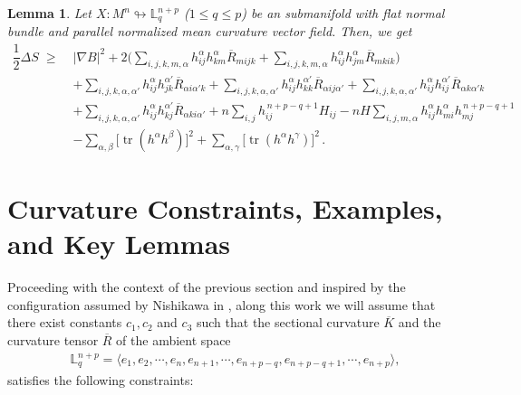 \documentclass[leqno,11pt]{amsart}
\theoremstyle{plain}
\newtheorem{lemma}[theorem]{\indent\sc Lemma}
\theoremstyle{definition}
\numberwithin{equation}{section}
\begin{document}
\begin{lemma}\label{simons desigualdade}
Let $X:M^{n}\looparrowright \mathbb{L}^{n+p}_{q}$ ($1\leq q\leq p$) be an submanifold with flat normal bundle and parallel normalized mean curvature vector field. Then, we get
\begin{equation}\label{simons_inequality}
\begin{aligned}
\dfrac{1}{2}\Delta S \; \geq \;& |\nabla B|^2
  + 2\Bigg(
      \sum_{i,j,k,m,\alpha} h_{ij}^{\alpha}h_{km}^{\alpha}\overline{R}_{mijk}
      + \sum_{i,j,k,m,\alpha} h_{ij}^{\alpha}h_{jm}^{\alpha}\overline{R}_{mkik}
    \Bigg) \\[6pt]
&+ \sum_{i,j,k,\alpha,\alpha'} h_{ij}^{\alpha}h_{jk}^{\alpha'}\overline{R}_{\alpha i \alpha' k}
  + \sum_{i,j,k,\alpha,\alpha'} h_{ij}^{\alpha}h_{kk}^{\alpha'}\overline{R}_{\alpha ij \alpha'}
  + \sum_{i,j,k,\alpha,\alpha'} h_{ij}^{\alpha}h_{ij}^{\alpha'}\overline{R}_{\alpha k \alpha' k} \\[6pt]
&+ \sum_{i,j,k,\alpha,\alpha'} h_{ij}^{\alpha}h_{kj}^{\alpha'}\overline{R}_{\alpha ki \alpha'}
  + n\sum_{i,j} h_{ij}^{\,n+p-q+1}H_{ij}
  - nH\sum_{i,j,m,\alpha} h_{ij}^{\alpha}h_{mi}^{\alpha}h_{mj}^{\,n+p-q+1} \\[6pt]
& - \sum_{\alpha,\beta} \big[\operatorname{tr}(h^{\alpha}h^{\beta})\big]^2
+ \sum_{\alpha,\gamma} \big[\operatorname{tr}(h^{\alpha}h^{\gamma})\big]^2
  \,.
\end{aligned}
\end{equation}
    
\end{lemma}






\section{Curvature Constraints, Examples, and Key Lemmas}\label{sec:key lemmas}

Proceeding with the context of the previous section and inspired by the configuration assumed by Nishikawa in \cite{Nishikawa: 84}, along this work we will assume that there exist constants $c_1,c_2$ and $c_3$ such that the sectional curvature $\overline{K}$ and the curvature tensor $\overline{R}$ of the ambient space
\begin{eqnarray*}
\mathbb{L}_{q}^{n+p}=\langle e_1,e_2,\cdots, e_n,e_{n+1},\cdots,e_{n+p-q},e_{n+p-q+1},\cdots,e_{n+p}\rangle,
\end{eqnarray*}
satisfies the following constraints:
\end{document}
